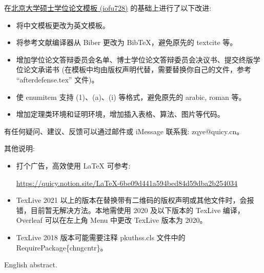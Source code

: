 \begin{cabstract}
    在\href{https://www.overleaf.com/latex/templates/2021-peking-university-master-thesis-template-iofu728-pkuthss/rwfvbkpzydpf}{北京大学硕士学位论文模板 (iofu728)} 的基础上进行了以下改进:
    \begin{itemize}
        \item 将中文模板更改为英文模板。
        \item 将参考文献编译器从 Biber 更改为 BibTeX，避免原先的 textcite 等。
        \item 增加学位论文答辩委员会名单、博士学位论文答辩委员会决议书、提交终版学位论文承诺书 (在模板中均由版权声明代替，需要替换你自己的文件，参考 ``afterdefense.tex'' 文件)。
        \item 使 enumitem 支持 (1)、(a)、(i) 等格式，避免原先的 arabic, roman 等。
        \item 增加定理类环境和证明环境，增加插入表格、算法、图片等代码。
    \end{itemize}

    \bigskip
    \bigskip

    有任何疑问、建议、反馈可以通过邮件或 iMessage 联系我: zqye@quicy.cn。
    
    \bigskip
    \bigskip
    
    其他说明:
    \begin{itemize}
        \item 打个广告，高效使用 LaTeX 可参考:

\url{https://quicy.notion.site/LaTeX-6be09d441a594bed84d59dba2b254034}
        \item TexLive 2021 以上的版本在替换带有二维码的版权声明或其他文件时，会报错，目前暂无解决方法。本地需使用 2020 及以下版本的 TexLive 编译，Overleaf 可以在左上角 Menu 中更改 TexLive 版本为 2020。
        \item TexLive 2018 版本可能需要注释 pkuthss.cls 文件中的 \\RequirePackage\{chngcntr\}。
    \end{itemize}
    
    
    


\end{cabstract}

\begin{eabstract}
English abstract.
\end{eabstract}